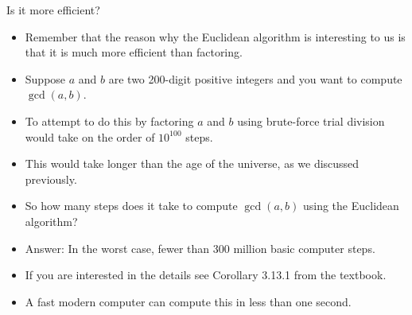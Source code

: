 \documentclass{beamer}
\begin{document}
\begin{frame}{Is it more efficient?}
\begin{itemize}
\item Remember that the reason why the Euclidean algorithm is interesting to us is that it is much more
efficient than factoring.
\item Suppose $a$ and $b$ are two 200-digit positive integers and you want to compute $\gcd(a,b)$.
\item To attempt to do this by factoring $a$ and $b$ using brute-force trial division would
take on the order of $10^{100}$ steps.
\item This would take longer than the age of the universe, as we discussed previously.
\item So how many steps does it take to compute $\gcd(a,b)$ using the Euclidean algorithm?
\item Answer: In the worst case, fewer than 300 million basic computer steps.
\item If you are interested in the details see Corollary 3.13.1 from the textbook.
\item A fast modern computer can compute this in less than one second.

\end{itemize}
\end{frame}
\end{document}
